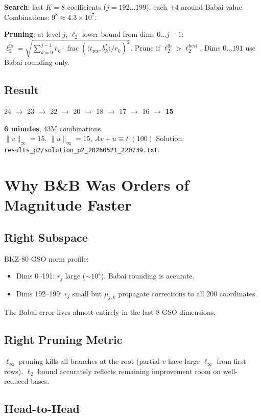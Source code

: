 \documentclass[11pt,a4paper]{article}
\DeclareMathOperator{\fracpart}{frac}
\begin{document}
\textbf{Search}: last $K=8$ coefficients ($j=192\ldots199$), each $\pm4$ around Babai value.
Combinations: $9^8 \approx 4.3\times 10^7$.

\textbf{Pruning}: at level $j$, $\ell_2$ lower bound from dims $0\ldots j-1$:
$\ell_2^{\text{lb}} = \sqrt{\sum_{k=0}^{j-1} r_k \cdot \fracpart(\langle t_{\text{res}}, b_k^*\rangle / r_k)^2}$.
Prune if $\ell_2^{\text{lb}} > \ell_2^{\text{best}}$.
Dims $0\ldots191$ use Babai rounding only.

\subsection{Result}
\begin{center}
24 $\rightarrow$ 23 $\rightarrow$ 22 $\rightarrow$ 20 $\rightarrow$ 18 $\rightarrow$ 17 $\rightarrow$ 16 $\rightarrow$ \textbf{15}
\end{center}

\textbf{6 minutes}, 43M combinations. \\
$\|v\|_\infty=15$, $\|u\|_\infty=15$, $Av+u\equiv t\;(100)$ \checkmark\;
Solution: \texttt{results\_p2/solution\_p2\_20260521\_220739.txt}.

\section{Why B\&B Was Orders of Magnitude Faster}

\subsection{Right Subspace}
BKZ-80 GSO norm profile:
\begin{itemize}
  \item Dims 0--191: $r_j$ large ($\sim 10^4$), Babai rounding is accurate.
  \item Dims 192--199: $r_j$ small but $\mu_{j,k}$ propagate corrections to all 200 coordinates.
\end{itemize}
The Babai error lives almost entirely in the last 8 GSO dimensions.

\subsection{Right Pruning Metric}
$\ell_\infty$ pruning kills all branches at the root (partial $v$ have large $\ell_\infty$ from first rows).
$\ell_2$ bound accurately reflects remaining improvement room on well-reduced bases.

\subsection{Head-to-Head}
\end{document}
